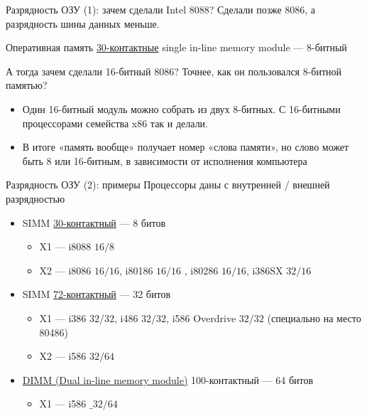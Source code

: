 \documentclass[xetex,aspectratio=43]{beamer}
\begin{document}
\begin{frame}{Разрядность ОЗУ (1): зачем сделали Intel 8088?}
Сделали позже 8086, а разрядность шины данных меньше.

\pause

Оперативная память
\href{https://en.wikipedia.org/wiki/SIMM\#30-pin_SIMMs}{30-контактные} single in-line memory module --- 8-битный

А тогда зачем сделали 16-битный 8086? Точнее, как он пользовался 8-битной памятью?

\pause

\begin{itemize}
    \item
    Один 16-битный модуль можно собрать из двух 8-битных. С 16-битными
    процессорами семейства x86 так и делали.
    \item
    В итоге «память вообще» получает номер «слова памяти», но слово может
    быть 8 или 16-битным, в зависимости от исполнения компьютера
\end{itemize}
\end{frame}

\begin{frame}{Разрядность ОЗУ (2): примеры}
Процессоры даны с внутренней / внешней разрядностью

\begin{itemize}
    \tightlist

    \item
    SIMM
    \href{https://en.wikipedia.org/wiki/SIMM\#30-pin_SIMMs}{30-контактный}
    --- 8 битов

    \begin{itemize}
        \tightlist
        \item
        X1 --- i8088 \({16/8}\)
        \item
        X2 --- i8086 \({16/16}\), i80186 \({16/16}\) , i80286
        \({16/16}\), i386SX \({32/16}\)
    \end{itemize}

    \item
    SIMM
    \href{https://en.wikipedia.org/wiki/SIMM\#72-pin_SIMMs}{72-контактный}
    --- 32 битов

    \begin{itemize}
        \tightlist
        \item
        X1 --- i386 \({32/32}\), i486 \({32/32}\), i586 Overdrive
        \({32/32}\) (специально на место 80486)
        \item
        X2 --- i586 \({32/64}\)
    \end{itemize}

    \item
    \href{https://en.wikipedia.org/wiki/DIMM}{DIMM (Dual in-line memory
        module)} 100-контактный --- 64 битов

    \begin{itemize}
        \tightlist
        \item
        X1 --- i586 \(\_{32/64}\)
    \end{itemize}
\end{itemize}

\end{frame}
\end{document}
